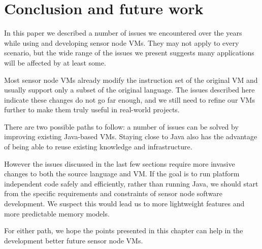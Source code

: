 \section{Conclusion and future work}
In this paper we described a number of issues we encountered over the years while using and developing sensor node VMs. They may not apply to every scenario, but the wide range of the issues we present suggests many applications will be affected by at least some.

Most sensor node VMs already modify the instruction set of the original VM and usually support only a subset of the original language. The issues described here indicate these changes do not go far enough, and we still need to refine our VMs further to make them truly useful in real-world projects.

There are two possible paths to follow: a number of issues can be solved by improving existing Java-based VMs. Staying close to Java also has the advantage of being able to reuse existing knowledge and infrastructure.

However the issues discussed in the last few sections require more invasive changes to both the source language and VM. If the goal is to run platform independent code safely and efficiently, rather than running Java, we should start from the specific requirements and constraints of sensor node software development. We suspect this would lead us to more lightweight features and more predictable memory models.

For either path, we hope the points presented in this chapter can help in the development better future sensor node VMs.
